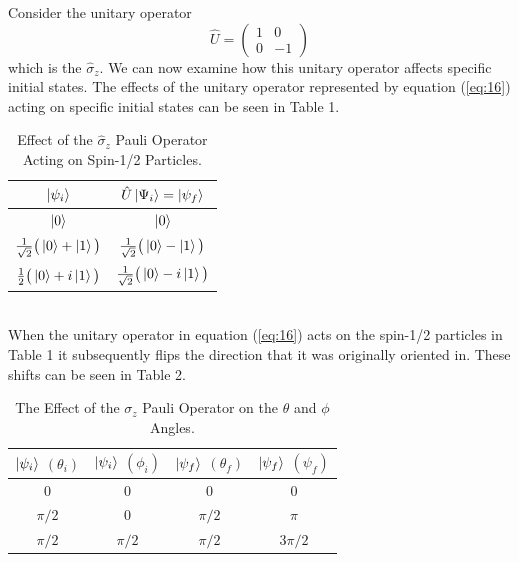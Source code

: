\documentclass[twocolumn]{article}
\begin{document}
Consider the unitary operator
\begin{equation}\label{eq:16}
\hat{U}=
\begin{pmatrix}
1 & 0 \\
0 & -1
\end{pmatrix}
\end{equation}
which is the $\hat{\sigma}_z$. We can now examine how this unitary operator affects specific initial states. The effects of the unitary operator represented by equation (\ref{eq:16}) acting on specific initial states can be seen in Table 1. 
\begin{table}[h!]
\begin{center}
\begin{tabular}{ |c|c| }
\hline $\ket{\psi_i}$& $\hat{U}\ket{\Psi_i}=\ket{\psi_f}$ \\
\hline $\ket{0}$& $\ket{0}$\\
\hline $\frac{1}{\sqrt{2}}\big(\ket{0}+\ket{1}\big)$& $\frac{1}{\sqrt{2}}\big(\ket{0}-\ket{1}\big)$\\
\hline $\frac{1}{2}\big(\ket{0}+i\ket{1}\big)$& $\frac{1}{\sqrt{2}}\big(\ket{0}-i\ket{1}\big)$\\
\hline
\end{tabular}
\caption{Effect of the $\hat{\sigma}_z$ Pauli Operator Acting on Spin-1/2 Particles.}
\end{center}
\end{table} \\
When the unitary operator in equation (\ref{eq:16}) acts on the spin-1/2 particles in Table 1 it subsequently flips the direction that it was originally oriented in. These shifts can be seen in Table 2.
\newpage
\begin{table}[h!]
\begin{center}
\begin{tabular}{ |c|c|c|c| }
\hline $\ket{\psi_i}$ $(\theta_i)$& $\ket{\psi_i}$ $(\phi_i)$& $\ket{\psi_f}$ $(\theta_f)$& $\ket{\psi_f}$ $(\psi_f)$ \\
\hline 0 & 0 & 0 & 0 \\
\hline $\pi/2$ & 0 & $\pi/2$ & $\pi$ \\
\hline $\pi/2$ & $\pi/2$ & $\pi/2$ & $3\pi/2$ \\
\hline
\end{tabular}
\caption{The Effect of the $\sigma_z$ Pauli Operator on the $\theta$ and $\phi$ Angles.}
\end{center}
\end{table} 
\end{document}
